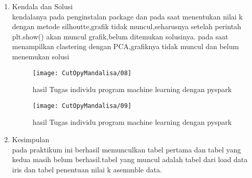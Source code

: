 \begin{enumerate}
\item Kendala dan Solusi\\
kendalanya pada penginstalan package dan pada saat menentukan nilai k dengan metode silhoutte,grafik tidak muncul,seharusnya setelah perintah plt.show() akan muncul grafik,belum ditemukan solusinya. pada saat menampilkan clastering dengan PCA,grafiknya tidak muncul dan belum menemukan solusi


\begin{figure}[!ht]
\texttt{[image: CutOpyMandalisa/08]}
\caption{hasil Tugas individu program machine learning dengan pyspark }
\label{gam:perkuliahan-05-01}
\end{figure}


\begin{figure}[!ht]
\texttt{[image: CutOpyMandalisa/09]}
\caption{hasil Tugas individu program machine learning dengan pyspark }
\label{gam:perkuliahan-05-01}
\end{figure}

\item Kesimpulan\\
pada praktikum ini berhasil memunculkan tabel pertama dan tabel yang kedua masih belum berhasil.tabel yang muncul adalah tabel dari load data iris dan tabel penentuan nilai k asemmble data.
\end{enumerate}